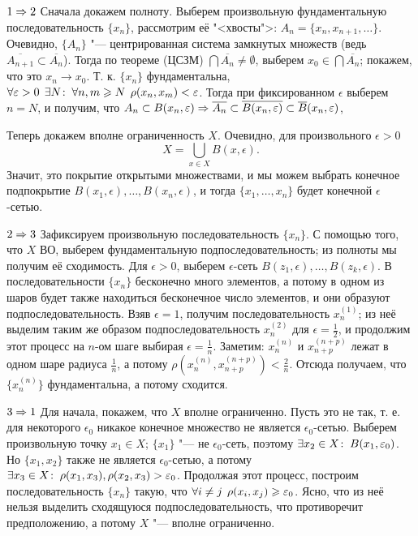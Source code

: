 \documentclass[main]{subfiles}
\begin{document}
\begin{itemproof}
\item[$ 1 \Rightarrow 2$]
  Сначала докажем полноту.
  Выберем произвольную фундаментальную последовательность
  \( \{ x_n \} \), рассмотрим её "<хвосты">:
  \( A_n = \{ x_n, x_{n+1}, \dots \} \).
  Очевидно, \( \{ A_n \} \) "---
  центрированная система замкнутых множеств
  (ведь \( \overline{A_{n+1}} \subset \overline{A_n} \)).
  Тогда по теореме (ЦСЗМ) \( \bigcap \overline{A_n} \ne \emptyset \),
  выберем \( x_0 \in \bigcap \overline{A_n} \); покажем,
  что это \( x_n \to x_0 \).
  Т. к. \( \{ x_n \} \) фундаментальна, 
  \( \forall {\varepsilon> 0} \; \, \exists N \colon \: \forall {n, m \geqslant N} \; \,
  \rho(x_n, x_m) < \varepsilon \).
  Тогда при фиксированном \( \epsilon \) выберем \( n = N \),
  и получим, что \( A_n \subset B(x_n, \varepsilon) \Rightarrow
  \overline{A_n} \subset \overline{B(x_n, \varepsilon)}
  \subset \overline{B}(x_n, \varepsilon) \),

  Теперь докажем вполне ограниченность \( X \).
  Очевидно, для произвольного \( \epsilon > 0 \)
  \[ X = \bigcup_{x \in X} B(x, \epsilon). \]
  Значит, это покрытие открытыми множествами,
  и мы можем выбрать конечное
  подпокрытие \( B(x_1, \epsilon), \dots, B(x_n, \epsilon) \),
  и тогда \( \{ x_1, \dots, x_n \} \) будет конечной \( \epsilon \)-сетью.
\item[$2 \Rightarrow 3$]
  Зафиксируем произвольную последовательность \( \{ x_n \} \).
  С помощью того, что \( X \) ВО, выберем фундаментальную
  подпоследовательность; из полноты мы получим её сходимость.
  Для \( \epsilon > 0 \), выберем
  \( \epsilon \)-сеть \( B(z_1, \epsilon), \dots, B(z_k, \epsilon) \).
  В последовательности \( \{ x_n \} \) бесконечно много элементов,
  а потому в одном из шаров будет также находиться
  бесконечное число элементов, и они образуют подпоследовательность.
  Взяв \( \epsilon = 1 \), получим последовательность
  \( x_n^{(1)} \); из неё выделим таким же образом
  подпоследовательность \( x_n^{(2)} \) для \( \epsilon = \frac{1}{2} \),
  и продолжим этот процесс на \( n \)-ом шаге выбирая
  \( \epsilon = \frac{1}{n} \).
  Заметим: \( x_n^{(n)} \) и \( x_{n+p}^{(n+p)} \)
  лежат в одном шаре радиуса \( \frac{1}{n} \),
  а потому \( \rho(x_n^{(n)}, x_{n+p}^{(n+p)}) < \frac{2}{n} \).
  Отсюда получаем, что \( \{ x_n^{(n)} \} \) фундаментальна,
  а потому сходится.
\item[$3 \Rightarrow 1$]
  Для начала, покажем, что \( X \) вполне ограниченно.
  Пусть это не так, т. е. для некоторого \( \epsilon_0 \)
  никакое конечное множество не является \( \epsilon_0 \)-сетью.
  Выберем произвольную точку \( x_1 \in X \);
  \( \{ x_1 \} \) "--- не \( \epsilon_0 \)-сеть,
  поэтому \( \exists x_2 \in X \colon \: B(x_1, \varepsilon_0) \).
  Но \( \{ x_1, x_2 \} \) также не является \( \epsilon_0 \)-сетью,
  а потому \( \exists x_3 \in X \colon \: \rho(x_1, x_3), \rho(x_2, x_3) > \varepsilon_0 \).
  Продолжая этот процесс, построим последовательность \( \{ x_n \} \)
  такую, что \( \forall {i \ne j} \; \, \rho(x_i, x_j) \geqslant \varepsilon_0 \).
  Ясно, что из неё нельзя выделить сходящуюся подпоследовательность,
  что противоречит предположению, а потому \( X \) "--- вполне ограниченно.


\end{itemproof}
\end{document}
